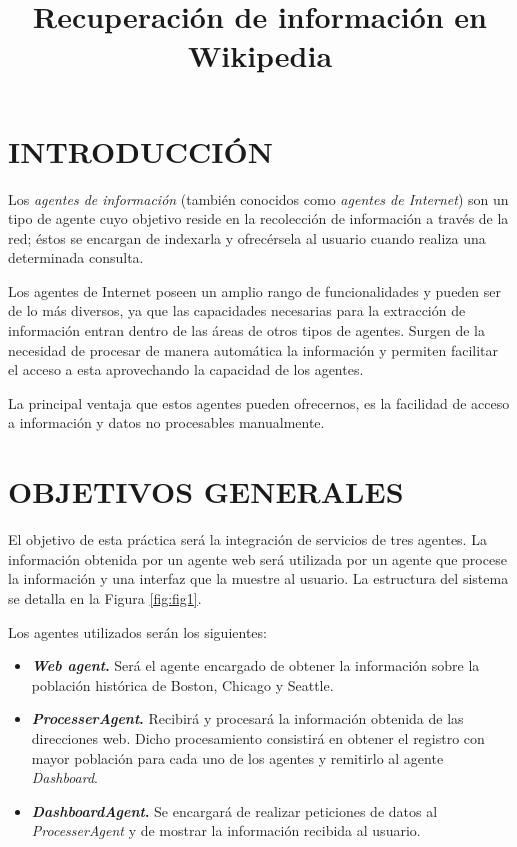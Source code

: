 \documentclass{estilo}
\title{Recuperación de información en Wikipedia}
\begin{document}
    \maketitle
    \tableofcontents

    \newpage
    
    \section{INTRODUCCIÓN}
    
    Los \textit{agentes de información} (también conocidos como \textit{agentes de Internet}) son un tipo de agente cuyo objetivo reside en la recolección de información a través de la red; éstos se encargan de indexarla y ofrecérsela al usuario cuando realiza una determinada consulta.
    
    Los agentes de Internet poseen un amplio rango de funcionalidades y pueden ser de lo más diversos, ya que las capacidades necesarias para la extracción de información entran dentro de las áreas de otros tipos de agentes. Surgen de la necesidad de procesar de manera automática la información y permiten facilitar el acceso a esta  aprovechando la capacidad de los agentes.

    La principal ventaja que estos agentes pueden ofrecernos, es la facilidad de acceso a información y datos no procesables manualmente.
    
    \bigskip
    \section{OBJETIVOS GENERALES}
    
    El objetivo de esta práctica será la integración de servicios de tres agentes. La información obtenida por un agente web será utilizada por un agente que procese la información y una interfaz que la muestre al usuario. La estructura del sistema se detalla en la Figura \ref{fig:fig1}.

    Los agentes utilizados serán los siguientes:
    \begin{itemize}
        \item \textbf{\textit{Web agent}.} Será el agente encargado de obtener la información sobre la población histórica de Boston, Chicago y Seattle.
        \item \textbf{\textit{ProcesserAgent}.} Recibirá y procesará la información obtenida de las direcciones web. Dicho procesamiento consistirá en obtener el registro con mayor población para cada uno de los agentes y remitirlo al agente \textit{Dashboard}.
        \item \textbf{\textit{DashboardAgent}.} Se encargará de realizar peticiones de datos al \textit{ProcesserAgent} y de mostrar la información recibida al usuario.
    \end{itemize}
\end{document}
